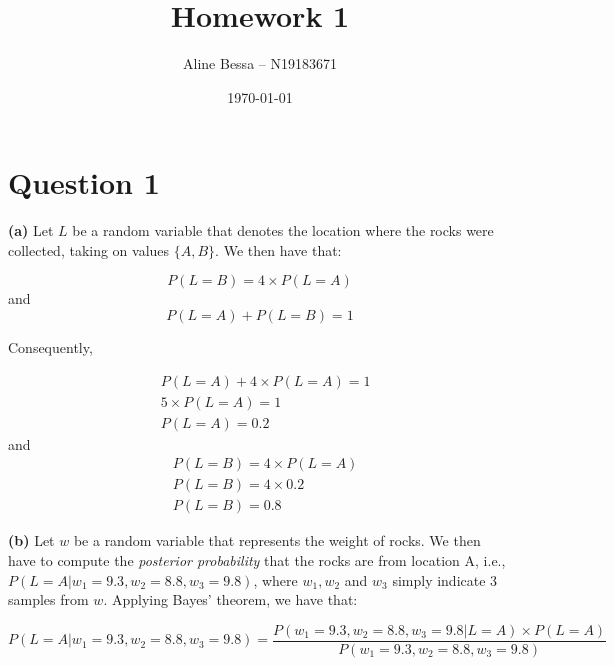 \documentclass[leqno]{article}
\title{Homework 1}
\author{Aline Bessa -- N19183671}
\date\today
\begin{document}
\maketitle %

\section*{Question 1}

\textbf{(a)} Let $L$ be a random variable that denotes the location where the rocks were collected, taking on values $\{A, B\}$. We then have that:

\begin{equation*}
P(L = B) = 4 \times P(L = A)
\end{equation*}
and
\begin{equation*}
P(L = A) + P(L = B) = 1 
\end{equation*}

\noindent Consequently, 

\begin{equation*}
\begin{split}
&P(L = A) + 4 \times P(L = A) = 1\\
&5 \times P(L = A) = 1\\
&P(L = A) = 0.2
\end{split}
\end{equation*}
and
\begin{equation*}
\begin{split}
&P(L = B) = 4 \times P(L = A) \\
&P(L = B) = 4 \times 0.2 \\
&P(L = B) = 0.8
\end{split}
\end{equation*}

\noindent \textbf{(b)} Let $w$ be a random variable that represents the weight of rocks. We then have to compute the \textit{posterior probability} that the rocks are from 
location A, i.e., $P(L = A| w_1 = 9.3, w_2 = 8.8, w_3 = 9.8)$, where $w_1, w_2$ and $w_3$ simply indicate 3 samples from $w$. Applying Bayes' theorem, we have that:

\begin{equation}
P(L = A| w_1 = 9.3, w_2 = 8.8, w_3 = 9.8) = \frac{P(w_1 = 9.3, w_2 = 8.8, w_3 = 9.8| L = A) \times P(L = A)}{P(w_1 = 9.3, w_2 = 8.8, w_3 = 9.8)}
\label{eq1}
\end{equation}
\end{document}
